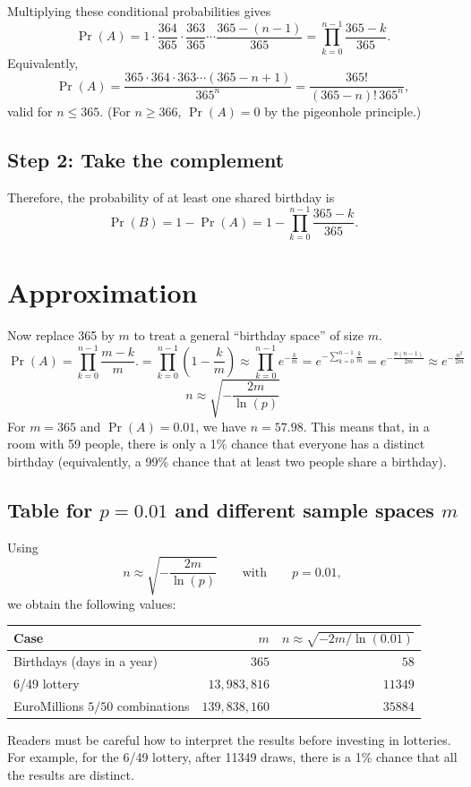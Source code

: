 Multiplying these conditional probabilities gives
\[
  \Pr(A)
  = 1\cdot \frac{364}{365}\cdot \frac{363}{365}\cdots
  \frac{365-(n-1)}{365}
  = \prod_{k=0}^{n-1}\frac{365-k}{365}.
\]
Equivalently,
\[
  \Pr(A)=\frac{365\cdot 364\cdot 363\cdots (365-n+1)}{365^n}
  =\frac{365!}{(365-n)!\,365^n},
\]
valid for \(n\le 365\). (For \(n\ge 366\), \(\Pr(A)=0\) by the pigeonhole
principle.)

\subsection*{Step 2: Take the complement}
Therefore, the probability of at least one shared birthday is
\[
  \Pr(B)=1-\Pr(A)
  = 1-\prod_{k=0}^{n-1}\frac{365-k}{365}.
\]

\section{Approximation}
Now replace 365 by \(m\) to treat a general ``birthday space'' of size \(m\).
\[
\Pr(A) = \prod_{k=0}^{n-1}\frac{m-k}{m}.
       = \prod_{k=0}^{n-1}(1-\frac{k}{m})
       \approx \prod_{k=0}^{n-1}e^{-\frac{k}{m}}
       =e^{-\sum_{k=0}^{n-1}\frac{k}{m}}
       =e^{-\frac{n(n-1)}{2m}}
       \approx e^{-\frac{n^2}{2m}}
\]
\[
n\approx \sqrt{-\frac{2m}{\ln(p)}}
\]
For \(m=365\) and \(\Pr(A) = 0.01\), we have \(n=57.98\).
This means that, in a room with 59 people, there is only a 1\% chance that
everyone has a distinct birthday (equivalently, a 99\% chance that at least two
people share a birthday).

\subsection*{Table for \(p=0.01\) and different sample spaces \(m\)}
Using
\[
n\approx \sqrt{-\frac{2m}{\ln(p)}}
\qquad\text{with}\qquad p=0.01,
\]
we obtain the following values:
\begin{center}
\begin{tabular}{l r r}
\hline
\textbf{Case} & \textbf{\(m\)} & \textbf{\(n \approx \sqrt{-2m/\ln(0.01)}\)} \\
\hline
Birthdays (days in a year) & \(365\) & \(58\) \\
6/49 lottery & \(13{,}983{,}816\) & \(11349\) \\
EuroMillions \(5/50\) combinations & \(139{,}838{,}160\) & \(35884\) \\
\hline
\end{tabular}
\end{center}
Readers must be careful how to interpret the results before investing in lotteries.
For example, for the 6/49 lottery, after 11349 draws, there is a 1\% chance that 
all the results are distinct.

